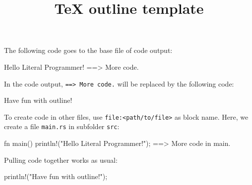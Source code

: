 \documentclass[11pt,a4paper]{article}
\title{TeX outline template}
\begin{document}
\maketitle

The following code goes to the base file of code output:

\begin{code}
Hello Literal Programmer!
==> More code.
\end{code}

In the code output, \verb`==> More code.` will be replaced by the following code:

\begin{code}[name=More code]
Have fun with outline!
\end{code}

To create code in other files, use \verb`file:<path/to/file>` as block name.
Here, we create a file \verb`main.rs` in subfolder \verb`src`:

\begin{code}[language=rust,name=file:src/main.rs]
fn main() {
    println!("Hello Literal Programmer!");
    ==> More code in main.
}
\end{code}

Pulling code together works as usual:

\begin{code}[language=rust,name=More code in main]
println!("Have fun with outline!");
\end{code}
\end{document}
